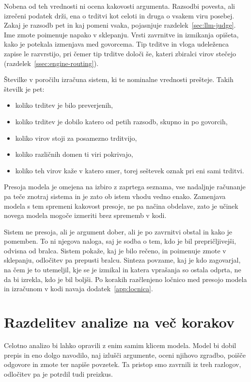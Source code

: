 \documentclass[a4paper, 12pt]{book}
\begin{document}
Nobena od teh vrednosti ni ocena kakovosti argumenta. Razsodbi povesta, ali izrečeni podatek drži, ena o trditvi kot celoti in druga o vsakem viru posebej. Zakaj je razsodb pet in kaj pomeni vsaka, pojasnjuje razdelek~\ref{sec:llm-judge}.
Ime zmote poimenuje napako v sklepanju. Vrsti zavrnitve in izmikanja opišeta,
kako je potekala izmenjava med govorcema. Tip trditve in vloga udeleženca zapise le razvrstijo, pri čemer tip trditve določi še, kateri
zbiralci virov stečejo (razdelek~\ref{ssec:engine-routing}).

Številke v poročilu izračuna sistem, ki te nominalne vrednosti prešteje. Takih
številk je pet:

\begin{itemize}
\item koliko trditev je bilo preverjenih,
\item koliko trditev je dobilo katero od petih razsodb, skupno in po govorcih,
\item koliko virov stoji za posamezno trditvijo,
\item koliko različnih domen ti viri pokrivajo,
\item koliko teh virov kaže v katero smer, torej seštevek oznak pri eni sami
trditvi.
\end{itemize}

Presoja modela je omejena na izbiro z zaprtega seznama, vse nadaljnje računanje
pa teče znotraj sistema in je zato ob istem vhodu vedno enako. Zamenjava modela s tem
spremeni kakovost presoje, ne pa načina obdelave, zato je učinek novega modela
mogoče izmeriti brez sprememb v kodi.

Sistem ne presoja, ali je argument dober, ali je po zavrnitvi obstal in kako je
pomemben. To ni njegova naloga, saj je sodba o tem, kdo je bil prepričljivejši,
odvisna od bralca. Sistem pokaže, kaj je bilo rečeno, in
poimenuje zmote v sklepanju, odločitev pa prepusti bralcu. Sinteza povzame, kaj je kdo zagovarjal, na čem je to utemeljil, kje se je
izmikal in katera vprašanja so ostala odprta, ne da bi izrekla, kdo je bil
boljši. Po korakih razčlenjeno ločnico med presojo modela in izračunom v kodi
navaja dodatek~\ref{app:locnica}.

\section{Razdelitev analize na več korakov}
\label{sec:koraki}

Celotno analizo bi lahko opravili z enim samim klicem modela. Model bi dobil prepis in eno dolgo navodilo, naj izlušči argumente, oceni njihovo
zgradbo, poišče odgovore in zmote ter napiše povzetek. Ta pristop smo zavrnili iz treh razlogov, odločitev pa je potrdil tudi preizkus.
\end{document}
